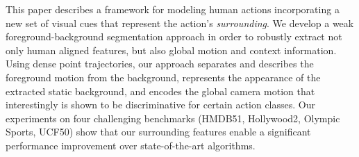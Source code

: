 This paper describes a framework for modeling human actions incorporating a new set of visual cues that represent the action's \emph{surrounding}.  We develop a weak foreground-background segmentation approach in order to robustly extract not only human aligned features, but also global motion and context information. Using dense point trajectories, our approach separates and describes the foreground motion from the background, represents the appearance of the extracted static background, and encodes the global camera motion that interestingly is shown to be discriminative for certain action classes. Our experiments on four challenging benchmarks (HMDB51, Hollywood2, Olympic Sports, UCF50) show that our surrounding features enable a significant performance improvement over state-of-the-art algorithms.
